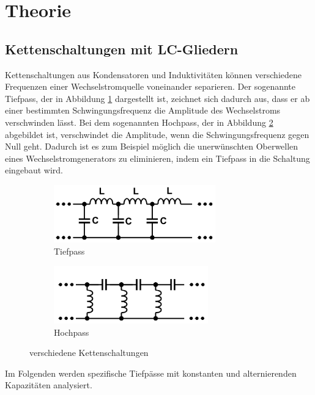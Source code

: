 \section{Theorie}
\label{sec:Theorie}

\subsection{Kettenschaltungen mit LC-Gliedern}

Kettenschaltungen aus Kondensatoren und Induktivitäten können verschiedene
Frequenzen einer Wechselstromquelle voneinander separieren.
Der sogenannte Tiefpass, der in Abbildung \ref{subfig:Tiefpass}
dargestellt ist, zeichnet
sich dadurch aus, dass er ab einer bestimmten Schwingungsfrequenz die Amplitude
des Wechselstroms verschwinden lässt.
Bei dem sogenannten Hochpass, der in Abbildung \ref{subfig:Hochpass}
abgebildet ist, verschwindet
die Amplitude, wenn die Schwingungsfrequenz gegen Null geht.
Dadurch ist es zum Beispiel möglich die unerwünschten Oberwellen eines
Wechselstromgenerators zu eliminieren, indem ein Tiefpass in die
Schaltung eingebaut wird.

\begin{figure}
  \centering
  \begin{subfigure}{0.48\textwidth}
    \centering
    \includegraphics[height=2.5cm]{Tiefpass.png}
    \caption{Tiefpass}
    \label{subfig:Tiefpass}
  \end{subfigure}
  \begin{subfigure}{0.48\textwidth}
    \centering
    \includegraphics[height=2.5cm]{Hochpass.png}
    \caption{Hochpass}
    \label{subfig:Hochpass}
  \end{subfigure}
  \caption{verschiedene Kettenschaltungen}
  \label{fig:Ketten}
\end{figure}
Im Folgenden werden spezifische Tiefpässe mit konstanten und
alternierenden Kapazitäten analysiert.


